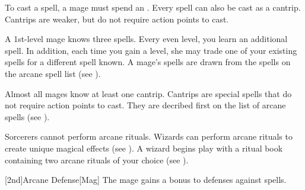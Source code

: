        To cast a spell, a mage must spend an .
        Every spell can also be cast as a cantrip.
        Cantrips are weaker, but do not require action points to cast.

        A 1st-level mage knows three spells.
        Every even level, you learn an additional spell.
        In addition, each time you gain a level, she may trade one of your existing spells for a different spell known.
        A mage's spells are drawn from the spells on the arcane spell list (see ).

        Almost all mages know at least one cantrip.
        Cantrips are special spells that do not require action points to cast.
        They are decribed first on the list of arcane spells (see ).

         Sorcerers cannot perform arcane rituals.
         Wizards can perform arcane rituals to create unique magical effects (see ).
        A wizard begins play with a ritual book containing two arcane rituals of your choice (see ).

        [2nd]{Arcane Defense}[Mag]
        The mage gains a  bonus to defenses against spells.

